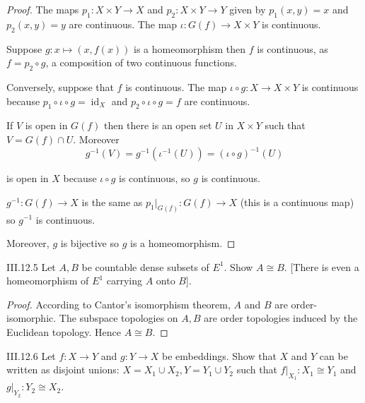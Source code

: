 \begin{proof}
	The maps \( p_{1}: X \times Y \to X \) and \( p_{2}: X \times Y \to Y \) given by \( p_{1}(x, y) = x \) and \( p_{2}(x, y) = y \) are continuous. The map \( \iota: G(f) \to X \times Y \) is continuous.

	Suppose \( g: x \mapsto (x, f(x)) \) is a homeomorphism then \( f \) is continuous, as \( f = p_{2} \circ g \), a composition of two continuous functions.

	\bigskip

	Conversely, suppose that \( f \) is continuous. The map \( \iota\circ g: X \to X \times Y \) is continuous because \( p_{1} \circ \iota \circ g = \operatorname{id}_{X} \) and \( p_{2} \circ \iota \circ g = f \) are continuous.

	If \( V \) is open in \( G(f) \) then there is an open set \( U \) in \( X\times Y \) such that \( V = G(f) \cap U \). Moreover
	\[
		g^{-1}(V) = g^{-1}(\iota^{-1}(U)) = {(\iota \circ g)}^{-1}(U)
	\]

	is open in \( X \) because \( \iota \circ g \) is continuous, so \( g \) is continuous.

	\( g^{-1}: G(f) \to X \) is the same as \( p_{1}\vert_{G(f)}: G(f) \to X \) (this is a continuous map) so \( g^{-1} \) is continuous.

	Moreover, \(g\) is bijective so \( g \) is a homeomorphism.
\end{proof}

\begin{problem}{III.12.5}
Let \( A, B \) be countable dense subsets of \( E^{1} \). Show \( A \cong B \). [There is even a homeomorphism of \( E^{1} \) carrying \(A\) onto \(B\)].
\end{problem}

\begin{proof}
	According to Cantor's isomorphism theorem, \( A \) and \( B \) are order-isomorphic. The subspace topologies on \( A, B \) are order topologies induced by the Euclidean topology. Hence \( A \cong B \).
\end{proof}

\begin{problem}{III.12.6}
Let \( f: X \to Y \) and \( g: Y \to X \) be embeddings. Show that \( X \) and \( Y \) can be written as disjoint unions: \( X = X_{1} \cup X_{2}, Y = Y_{1} \cup Y_{2} \) such that \( f\vert_{X_{1}}: X_{1} \cong Y_{1} \) and \( g\vert_{Y_{2}}: Y_{2} \cong X_{2} \).
\end{problem}

